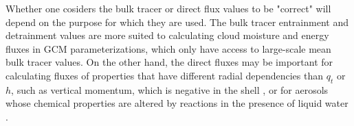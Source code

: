 \documentclass[draft,grl]{agutex}
\begin{document}
\begin{article}
Whether one cosiders the bulk tracer or direct flux values to be "correct" will 
depend on the purpose for which they are used.  The bulk tracer entrainment and 
detrainment values are more suited to calculating cloud moisture and energy 
fluxes in GCM parameterizations, which only have access to large-scale mean 
bulk tracer values.  On the other hand, the direct fluxes may be important for 
calculating fluxes of properties that have different radial dependencies than 
$q_t$ or $h$, such as vertical momentum, which is negative in the shell 
\citep{Heus2008}, or for aerosols whose chemical properties are altered by 
reactions in the presence of liquid water \citep{Hoppel1994}.  


%
%
%
%
%
%


\end{article}
\end{document}
